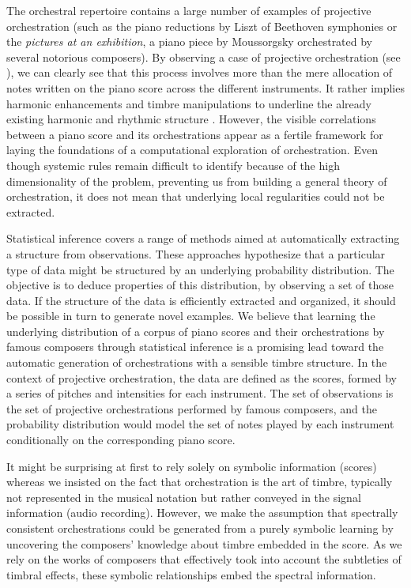 \documentclass[letterpaper]{article}
\begin{document}
The orchestral repertoire contains a large number of examples of projective orchestration (such as the piano reductions by Liszt of Beethoven symphonies or the \textit{pictures at an exhibition}, a piano piece by Moussorgsky orchestrated by several notorious composers). By observing a case of projective orchestration (see ), we can clearly see that this process involves more than the mere allocation of notes written on the piano score across the different instruments. It rather implies harmonic enhancements and timbre manipulations to underline the already existing harmonic and rhythmic structure \cite{mcadams2013timbre}. However, the visible correlations between a piano score and its orchestrations appear as a fertile framework for laying the foundations of a computational exploration of orchestration. Even though systemic rules remain difficult to identify because of the high dimensionality of the problem, preventing us from building a general theory of orchestration, it does not mean that underlying local regularities could not be extracted.

Statistical inference covers a range of methods aimed at automatically extracting a structure from observations. These approaches hypothesize that a particular type of data might be structured by an underlying probability distribution. The objective is to deduce properties of this distribution, by observing a set of those data. 
If the structure of the data is efficiently extracted and organized, it should be possible in turn to generate novel examples.
We believe that learning the underlying distribution of a corpus of piano scores and their orchestrations by famous composers through statistical inference is a promising lead toward the automatic generation of orchestrations with a sensible timbre structure.
In the context of projective orchestration, the data are defined as the scores, formed by a series of pitches and intensities for each instrument. The set of observations is the set of projective orchestrations performed by famous composers, and the probability distribution would model the set of notes played by each instrument conditionally on the corresponding piano score.

It might be surprising at first to rely solely on symbolic information (scores) whereas we insisted on the fact that orchestration is the art of timbre, typically not represented in the musical notation but rather conveyed in the signal information (audio recording).
However, we make the assumption that spectrally consistent orchestrations could be generated from a purely symbolic learning by uncovering the composers' knowledge about timbre embedded in the score. As we rely on the works of composers that effectively took into account the subtleties of timbral effects, these symbolic relationships embed the spectral information.
\end{document}
